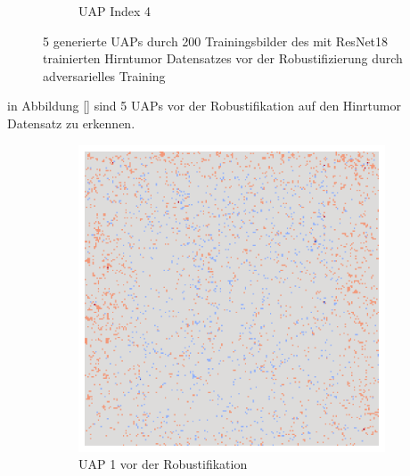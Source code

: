 \begin{figure}[ht!]
\begin{subfigure}{0.19\linewidth}
        \caption{UAP Index 4}
    \end{subfigure}
    \caption{5 generierte UAPs durch 200 Trainingsbilder des mit ResNet18 trainierten Hirntumor Datensatzes vor der Robustifizierung durch adversarielles Training}
    \label{fig:uap-resnet18-mri-rob0}
\end{figure}

in Abbildung \ref{} sind 5 UAPs vor der Robustifikation auf den Hinrtumor Datensatz zu erkennen. 

\newpage

\begin{figure}[ht!]
    \centering
    \begin{subfigure}{0.19\linewidth}
        \centering
        \includegraphics[height=1\linewidth]{01-images/05-resultate/uap_resnet/uap0-resnet18-mri-n200-robustificationslevel0.png}
        \caption{UAP 1 vor der Robustifikation}
    \end{subfigure}
    \begin{subfigure}{0.19\linewidth}
        \centering

\end{subfigure}
\end{figure}

